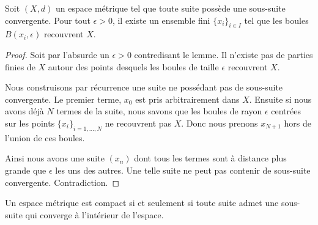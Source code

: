\begin{lemma}   \label{LemMGQqgDG}
	Soit \( (X,d)\) un espace métrique tel que toute suite possède une sous-suite convergente. Pour tout \( \epsilon>0\), il existe un ensemble fini \( \{ x_i \}_{i\in I}\) tel que les boules \( B(x_i,\epsilon)\) recouvrent \( X\).
\end{lemma}

\begin{proof}
	Soit par l'absurde un \( \epsilon>0\) contredisant le lemme. Il n'existe pas de parties finies de \( X\) autour des points desquels les boules de taille \( \epsilon\) recouvrent \( X\).

	Nous construisons par récurrence une suite ne possédant pas de sous-suite convergente. Le premier terme, \( x_0\) est pris arbitrairement dans \( X\). Ensuite si nous avons déjà \( N\) termes de la suite, nous savons que les boules de rayon \( \epsilon\) centrées sur les points \( \{ x_i \}_{i=1,\ldots, N}\) ne recouvrent pas \( X\). Donc nous prenons \( x_{N+1}\) hors de l'union de ces boules.

	Ainsi nous avons une suite \( (x_n)\) dont tous les termes sont à distance plus grande que \( \epsilon\) les uns des autres. Une telle suite ne peut pas contenir de sous-suite convergente. Contradiction.
\end{proof}

\begin{theorem}\label{ThoBWFTXAZNH}
	Un espace métrique est compact si et seulement si toute suite admet une sous-suite qui converge à l'intérieur de l'espace.
\end{theorem}

